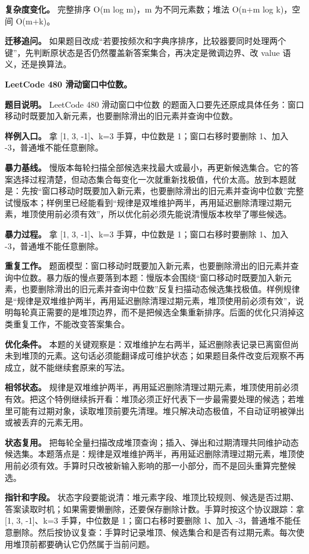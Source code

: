 \textbf{复杂度变化。} 完整排序 O(m log m)，m 为不同元素数；堆法 O(n+m log k)，空间 O(m+k)。

\textbf{迁移追问。} 如果题目改成“若要按频次和字典序排序，比较器要同时处理两个键”，先判断原状态是否仍然覆盖新答案集合，再决定是微调边界、改 value 语义，还是换算法。

\noindent\textbf{LeetCode 480 滑动窗口中位数。}

\textbf{题目说明。} LeetCode 480 滑动窗口中位数 的题面入口要先还原成具体任务：窗口移动时既要加入新元素，也要删除滑出的旧元素并查询中位数。

\textbf{样例入口。} 拿 [1, 3, -1]、k=3 手算，中位数是 1；窗口右移时要删除 1、加入 -3，普通堆不能任意删除。

\textbf{暴力基线。} 慢版本每轮扫描全部候选来找最大或最小，再更新候选集合。它的答案选择过程清楚，但动态集合每变化一次就重新找极值，代价太高。放到本题就是：先按“窗口移动时既要加入新元素，也要删除滑出的旧元素并查询中位数”完整试慢版本；样例里已经能看到“规律是双堆维护两半，再用延迟删除清理过期元素，堆顶使用前必须有效”，所以优化前必须先能说清慢版本枚举了哪些候选。

\textbf{暴力过程。} 拿 [1, 3, -1]、k=3 手算，中位数是 1；窗口右移时要删除 1、加入 -3，普通堆不能任意删除。

\textbf{重复工作。} 题面模型：窗口移动时既要加入新元素，也要删除滑出的旧元素并查询中位数。暴力版的慢点要落到本题：慢版本会围绕“窗口移动时既要加入新元素，也要删除滑出的旧元素并查询中位数”反复扫描动态候选集找极值。样例规律是“规律是双堆维护两半，再用延迟删除清理过期元素，堆顶使用前必须有效”，说明每轮真正需要的是堆顶边界，而不是把候选全集重新排序。后面的优化只消掉这类重复工作，不能改变答案集合。

\textbf{优化条件。} 本题的关键观察是：双堆维护左右两半，延迟删除表记录已离窗但尚未到堆顶的元素。这句话必须能翻译成可维护状态；如果题目条件改变后观察不再成立，就不能继续套原来的写法。

\textbf{相邻状态。} 规律是双堆维护两半，再用延迟删除清理过期元素，堆顶使用前必须有效。把这个特例继续拆开看：堆顶必须正好代表下一步最需要处理的候选；若堆里可能有过期对象，读取堆顶前要先清理。堆只解决动态极值，不自动证明被弹出或被丢弃的元素无用。

\textbf{状态复用。} 把每轮全量扫描改成堆顶查询；插入、弹出和过期清理共同维护动态候选集。本题落点是：规律是双堆维护两半，再用延迟删除清理过期元素，堆顶使用前必须有效。手算时只改被新输入影响的那一小部分，而不是回头重算完整候选。

\textbf{指针和字段。} 状态字段要能说清：堆元素字段、堆顶比较规则、候选是否过期、答案读取时机；如果需要懒删除，还要保存删除计数。手算时按这个协议跟踪：拿 [1, 3, -1]、k=3 手算，中位数是 1；窗口右移时要删除 1、加入 -3，普通堆不能任意删除。然后按协议复查：手算时记录堆顶、候选集合和是否有过期元素。每次使用堆顶前都要确认它仍然属于当前问题。


